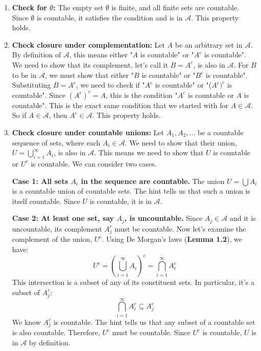 \documentclass[11pt,a4paper]{article}
\begin{document}
\begin{enumerate}
    \item \textbf{Check for $\emptyset$:} The empty set $\emptyset$ is finite, and all finite sets are countable. Since $\emptyset$ is countable, it satisfies the condition and is in $\mathcal{A}$. This property holds.

    \item \textbf{Check closure under complementation:}
    Let $A$ be an arbitrary set in $\mathcal{A}$. By definition of $\mathcal{A}$, this means either "$A$ is countable" or "$A^c$ is countable".
    We need to show that its complement, let's call it $B = A^c$, is also in $\mathcal{A}$.
    For $B$ to be in $\mathcal{A}$, we must show that either "$B$ is countable" or "$B^c$ is countable".
    Substituting $B = A^c$, we need to check if "$A^c$ is countable" or "($A^c)^c$ is countable".
    Since $(A^c)^c = A$, this is the condition "$A^c$ is countable or $A$ is countable".
    This is the exact same condition that we started with for $A \in \mathcal{A}$. So if $A \in \mathcal{A}$, then $A^c \in \mathcal{A}$. This property holds.

    \item \textbf{Check closure under countable unions:}
    Let $A_1, A_2, \ldots$ be a countable sequence of sets, where each $A_i \in \mathcal{A}$. We need to show that their union, $U = \bigcup_{i=1}^{\infty} A_i$, is also in $\mathcal{A}$. This means we need to show that $U$ is countable or $U^c$ is countable. We can consider two cases.

    \textbf{Case 1: All sets $A_i$ in the sequence are countable.}
    The union $U = \bigcup A_i$ is a countable union of countable sets. The hint tells us that such a union is itself countable. Since $U$ is countable, it is in $\mathcal{A}$.

    \textbf{Case 2: At least one set, say $A_j$, is uncountable.}
    Since $A_j \in \mathcal{A}$ and it is uncountable, its complement $A_j^c$ must be countable.
    Now let's examine the complement of the union, $U^c$. Using De Morgan's laws (\textbf{Lemma 1.2}), we have:
    \[ U^c = \left(\bigcup_{i=1}^{\infty} A_i\right)^c = \bigcap_{i=1}^{\infty} A_i^c \]
    This intersection is a subset of any of its constituent sets. In particular, it's a subset of $A_j^c$:
    \[ \bigcap_{i=1}^{\infty} A_i^c \subseteq A_j^c \]
    We know $A_j^c$ is countable. The hint tells us that any subset of a countable set is also countable. Therefore, $U^c$ must be countable.
    Since $U^c$ is countable, $U$ is in $\mathcal{A}$ by definition.
\end{enumerate}
\end{document}

